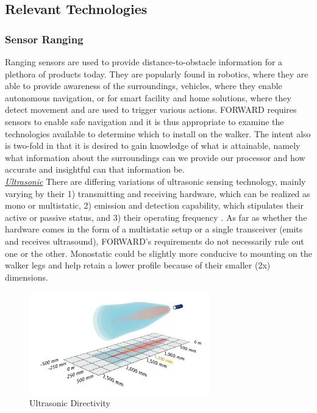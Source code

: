 \subsection{Relevant Technologies}

\subsubsection{Sensor Ranging}
\noindent Ranging sensors are used to provide distance-to-obstacle information for a plethora of products today. They are popularly found in robotics, where they are able to provide awareness of the surroundings, vehicles, where they enable autonomous navigation, or for smart facility and home solutions, where they detect movement and are used to trigger various actions. FORWARD requires sensors to enable safe navigation and it is thus appropriate to examine the technologies available to determine which to install on the walker. The intent also is two-fold in that it is desired to gain knowledge of what is attainable, namely what information about the surroundings can we provide our processor and how accurate and insightful can that information be.\\

\noindent \underline{\textit{Ultrasonic}} There are differing variations of ultrasonic sensing technology, mainly varying by their 1) transmitting and receiving hardware, which can be realized as mono or multistatic, 2) emission and detection capability, which stipulates their active or passive status, and 3) their operating frequency \cite{sonar-type}. As far as whether the hardware comes in the form of a multistatic setup or a single transceiver (emits and receives ultrasound), FORWARD's requirements do not necessarily rule out one or the other. Monostatic could be slightly more conducive to mounting on the walker legs and help retain a lower profile because of their smaller (2x) dimensions.\\

\begin{figure}[h]
	\centering
	\includegraphics[width=0.7\textwidth]{./Images/cool-ultrasonic-directivity.png}
	\caption{\label{fig:cool-directivity}Ultrasonic Directivity \cite{coolUltraDirect}}
\end{figure}

